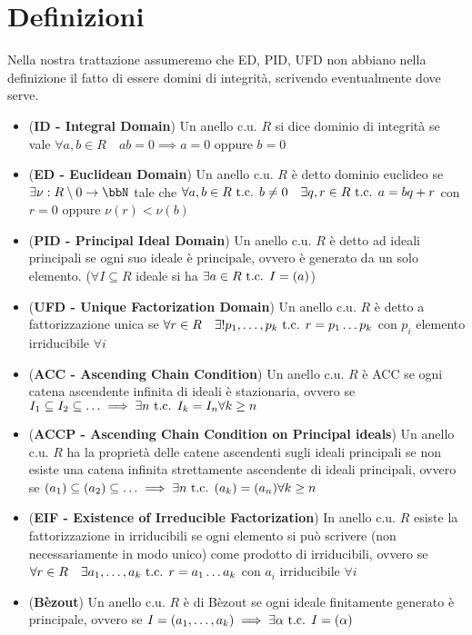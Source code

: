\documentclass[a4paper,GeneralMath,NoNotes]{stdmdoc}
\newcommand{\opp}{\text{ oppure }}
\begin{document}
	\section*{Definizioni}
	Nella nostra trattazione assumeremo che ED, PID, UFD non abbiano nella definizione il fatto di essere domini di integrità, scrivendo eventualmente dove serve.
	\begin{itemize}
		\item ({\bf ID - Integral Domain}) Un anello c.u. $R$ si dice dominio di integrità se vale $\forall a, b \in R \quad ab = 0 \implies a = 0 \opp b = 0$
		\item ({\bf ED - Euclidean Domain}) Un anello c.u. $R$ è detto dominio euclideo se $\exists \nu : R \setminus {0} \rar \bbN$ tale che $\forall a, b \in R \mbox{ t.c. } b \neq 0 \quad \exists q, r \in R \mbox{ t.c. } a = bq + r$ con $r = 0$ oppure $\nu(r) < \nu(b)$
		\item ({\bf PID - Principal Ideal Domain}) Un anello c.u. $R$ è detto ad ideali principali se ogni suo ideale è principale, ovvero è generato da un solo elemento. ($\forall I \subseteq R$ ideale si ha $\exists a \in R \mbox{ t.c. } I = (a)$)
		\item ({\bf UFD - Unique Factorization Domain}) Un anello c.u. $R$ è detto a fattorizzazione unica se $\forall r \in R \quad \exists ! p_1, \ldots, p_k \mbox{ t.c. } r = p_1 \ldots p_k$ con $p_i$ elemento irriducibile $\forall i$
		\item ({\bf ACC - Ascending Chain Condition}) Un anello c.u. $R$ è ACC se ogni catena ascendente infinita di ideali è stazionaria, ovvero se $I_1 \subseteq I_2 \subseteq \ldots \implies \exists n \mbox{ t.c. } I_k = I_n \forall k \ge n$
		\item ({\bf ACCP - Ascending Chain Condition on Principal ideals}) Un anello c.u. $R$ ha la proprietà delle catene ascendenti sugli ideali principali se non esiste una catena infinita strettamente ascendente di ideali principali, ovvero se $(a_1) \subseteq (a_2) \subseteq \ldots \implies \exists n \mbox{ t.c. } (a_k) = (a_n) \forall k \ge n$
		\item ({\bf EIF - Existence of Irreducible Factorization}) In anello c.u. $R$ esiste la fattorizzazione in irriducibili se ogni elemento si può scrivere (non necessariamente in modo unico) come prodotto di irriducibili, ovvero se $\forall r \in R \quad \exists a_1, \ldots, a_k \mbox{ t.c. } r = a_1 \ldots a_k$ con $a_i$ irriducibile $\forall i$
		\item ({\bf Bèzout}) Un anello c.u. $R$ è di Bèzout se ogni ideale finitamente generato è principale, ovvero se $I = (a_1, \ldots, a_k) \implies \exists \alpha \mbox{ t.c. } I = (\alpha)$

\end{itemize}
\end{document}
